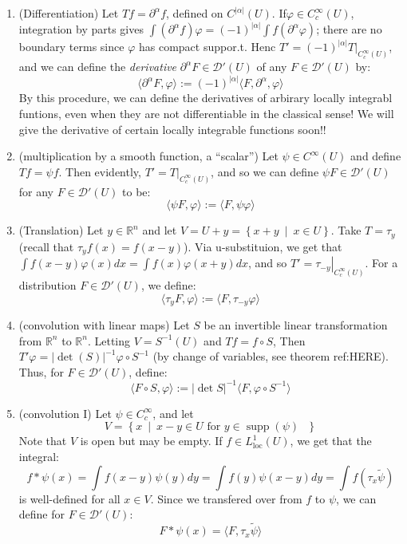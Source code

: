\documentclass{book}
\newcommand{\R}{{\mathbb{R}}}
\newcommand{\CD}{{\mathcal{D}}}
\renewcommand{\phi}{\varphi}
\newcommand{\supp}{\operatorname{supp}}
\newcommand{\set}[2]{\left\{#1 \ \middle|\ #2\right\}}
\begin{document}
\begin{enumerate}
	\item (Differentiation) Let $Tf =  \partial^\alpha f$, defined on $C^{|\alpha|}(U)$. If$\phi \in C_c^\infty(U)$,
		integration by parts gives $\int (  \partial^\alpha f )\phi = (-1)^{|\alpha|}\int f(  \partial^\alpha \phi )$;
		there are no boundary terms since $\phi$ has compact suppor.t. Henc $T' = (-1)^{|\alpha|}T|_{C_c^{\infty}(U)}$,
		and we can define the \emph{derivative} $  \partial^\alpha F \in \CD'(U)$ of any $F \in \CD'(U)$ by:
		\[
			\langle  \partial^\alpha F, \phi\rangle := (-1)^{|\alpha|}\langle F,  \partial^\alpha, \phi\rangle
		\]
		By this procedure, we can define the derivatives of arbirary locally integrabl funtions, even when they are not
		differentiable in the classical sense! We will give the derivative of certain locally integrable functions
		soon!!
	\item (multiplication by a smooth function, a ``scalar'') Let $\psi \in C^\infty(U)$ and define $Tf= \psi f$. Then
		evidently, $T' = T|_{C_c^\infty(U)}$, and so we can define $\psi F \in \CD'(U)$ for any $F \in \CD'(U)$ to be:
		\[
			\langle \psi F, \phi\rangle := \langle F, \psi\phi\rangle
		\]
	\item (Translation) Let $y \in \R^n$ and let $V = U + y = \set{x+y}{x \in U}$. Take $T = \tau_y$ (recall that
		$\tau_yf(x) = f(x-y)$). Via u-substituion, we get that $\int f(x-y)\phi(x)dx = \int f(x)\phi(x+y)dx$, and so $T'
		= \left.\tau_{-y}\right|_{C_c^\infty(U)}$. For a distribution $F \in \CD'(U)$, we define:
			\[
				\langle \tau_yF, \phi\rangle := \langle F, \tau_{-y}\phi\rangle
			\]
	\item (convolution with linear maps) Let $S$ be an invertible linear transformation from $\R^n$ to $\R^n$. Letting
		$V = S^{-1}(U)$ and $Tf = f\circ S$, Then $T'\phi = |\det(S)|^{-1} \phi \circ S^{-1}$ (by change of variables,
		see theorem ref:HERE).
		Thus, for $F \in \CD'(U)$, define:
		\[
			\langle F\circ S, \phi\rangle := |\det S|^{-1}\langle F, \phi \circ S^{-1}\rangle
		\]
	\item (convolution I) Let $\psi \in C_c^\infty$, and let
		\[
			V= \set{x}{x-y \in U\text{ for $y\in \supp(\psi)$ }}
		\]
		Note that $V$ is open but may be empty. If $f \in L_{\text{loc}}^1(U)$, we get that the integral:
		\[
			f* \psi(x) = \int f(x-y)\psi(y)dy = \int f(y)\psi(x-y)dy = \int f(\tau_x \tilde{\psi})
		\]
		is well-defined for all $x \in V$. Since we transfered over from $f$ to $\psi$, we can define for $F \in
		\CD'(U)$:
		\[
			F*\psi(x) = \langle F, \tau_x\tilde{\psi}\rangle
\]
\end{enumerate}
\end{document}
